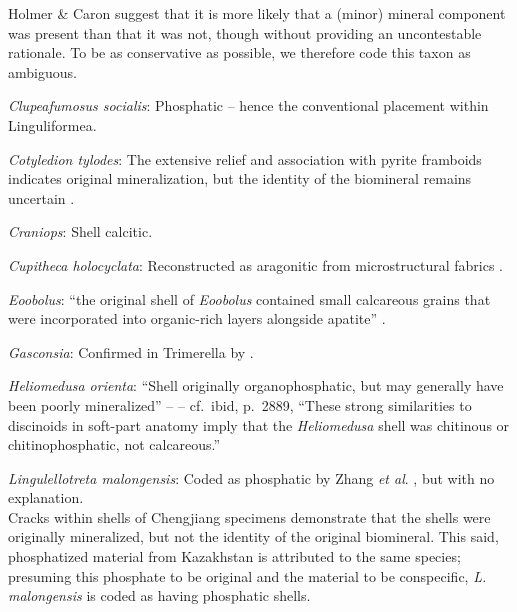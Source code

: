 \documentclass[openany]{book}
\begin{document}
Holmer \& Caron \citeyearpar[p.~286]{Holmer2006Aspinose} suggest that it
is more likely that a (minor) mineral component was present than that it
was not, though without providing an uncontestable rationale. To be as
conservative as possible, we therefore code this taxon as ambiguous.

\hypertarget{Clupeafumosus_socialis-coding-128}{}
\emph{Clupeafumosus socialis}: Phosphatic -- hence the conventional
placement within Linguliformea.

\hypertarget{Cotyledion_tylodes-coding-128}{}
\emph{Cotyledion tylodes}: The extensive relief and association with
pyrite framboids indicates original mineralization, but the identity of
the biomineral remains uncertain \citep{Zhang2013}.

\hypertarget{Craniops-coding-128}{}
\emph{Craniops}: Shell calcitic.

\hypertarget{Cupitheca_holocyclata-coding-128}{}
\emph{Cupitheca holocyclata}: Reconstructed as aragonitic from
microstructural fabrics \citep{Vendrasco2017}.

\hypertarget{Eoobolus-coding-128}{}
\emph{Eoobolus}: ``the original shell of \emph{Eoobolus} contained small
calcareous grains that were incorporated into organic-rich layers
alongside apatite'' \citep{Balthasar2007Anearly}.

\hypertarget{Gasconsia-coding-128}{}
\emph{Gasconsia}: Confirmed in Trimerella by
\citet{Balthasar2011Relicaragonite}.

\hypertarget{Heliomedusa_orienta-coding-128}{}
\emph{Heliomedusa orienta}: ``Shell originally organophosphatic, but may
generally have been poorly mineralized'' --
\citet{Williams2007Supplement} -- cf.~ibid, p.~2889, ``These strong
similarities to discinoids in soft-part anatomy imply that the
\emph{Heliomedusa} shell was chitinous or chitinophosphatic, not
calcareous.''

\hypertarget{Lingulellotreta_malongensis-coding-128}{}
\emph{Lingulellotreta malongensis}: Coded as phosphatic by Zhang
\emph{et al}. \citeyearpar{Zhang2014Anearly}, but with no explanation.\\
Cracks within shells of Chengjiang specimens \citep[e.g.][fig.
3]{Zhang2007Noteon} demonstrate that the shells were originally
mineralized, but not the identity of the original biomineral. This said,
phosphatized material from Kazakhstan \citep{Holmer1997EarlyCambrian} is
attributed to the same species; presuming this phosphate to be original
and the material to be conspecific, \emph{L. malongensis} is coded as
having phosphatic shells.
\end{document}
